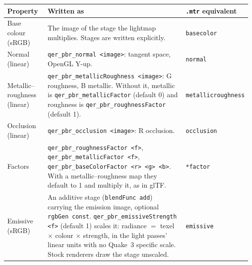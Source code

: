 \documentclass[11pt,a4paper]{article}
\begin{document}
\begin{tabular}{@{}p{}p{}p{}@{}}
\toprule
Property & Written as & \texttt{.mtr} equivalent \\
\midrule
Base colour (sRGB) & The image of the stage the lightmap multiplies. Stages are written
  explicitly. & \texttt{basecolor} \\
Normal (linear) & \texttt{qer\_pbr\_normal <image>}: tangent space, OpenGL Y-up. & \texttt{normal} \\
Metallic--roughness (linear) & \texttt{qer\_pbr\_metallicRoughness <image>}: G roughness,
  B metallic. Without it, metallic is \texttt{qer\_pbr\_metallicFactor} (default 0) and roughness
  is \texttt{qer\_pbr\_roughnessFactor} (default 1). & \texttt{metallicroughness} \\
Occlusion (linear) & \texttt{qer\_pbr\_occlusion <image>}: R occlusion. & \texttt{occlusion} \\
Factors & \texttt{qer\_pbr\_roughnessFactor <f>}, \texttt{qer\_pbr\_metallicFactor <f>},
  \texttt{qer\_pbr\_baseColorFactor <r> <g> <b>}. With a metallic--roughness map they default to
  1 and multiply it, as in glTF. &
  \texttt{*factor} \\
Emissive (sRGB) & An additive stage (\texttt{blendFunc add}) carrying the emission image, optional
  \texttt{rgbGen const}. \texttt{qer\_pbr\_emissiveStrength <f>} (default 1) scales it: radiance
  $=$ texel $\times$ colour $\times$ strength, in the light passes' linear units with no Quake~3
  specific scale. Stock renderers draw
  the stage unscaled. &
  \texttt{emissive} \\
\bottomrule
\end{tabular}
\end{document}
